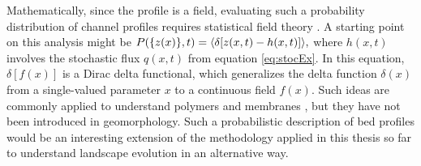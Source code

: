 Mathematically, since the profile is a field, evaluating such a probability distribution of channel profiles requires statistical field theory \citep{Kardar2007}.
A starting point on this analysis might be $P(\{z(x)\},t) = \langle \delta[z(x,t)-h(x,t)]\rangle,$ where $h(x,t)$ involves the stochastic flux $q(x,t)$ from equation \ref{eq:stocEx}.
In this equation, $\delta[f(x)]$ is a Dirac delta functional, which generalizes the delta function $\delta(x)$ from a single-valued parameter $x$ to a continuous field $f(x)$.
Such ideas are commonly applied to understand polymers and membranes \citep{Kawakatsu2001,Nelson2004}, but they have not been introduced in geomorphology. Such a probabilistic description of bed profiles would be an interesting extension of the methodology applied in this thesis so far to understand landscape evolution in an alternative way.